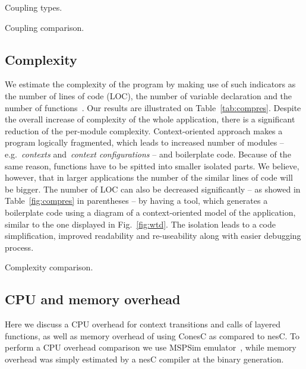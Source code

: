 \begin{table}[!h]
\renewcommand{\arraystretch}{1.3}
\caption{Coupling types.}
\label{tab:couptypes}

\end{table}

\begin{table}[!h]
\renewcommand{\arraystretch}{1.3}
\caption{Coupling comparison.}
\label{tab:coupres}

\end{table}

\subsection{Complexity} 

We estimate the complexity of the program by making use of such indicators as the number of
lines of code (LOC), the number of variable declaration and the number of
functions~\cite{pressman01}. Our results are illustrated on
Table~\ref{tab:compres}. Despite the overall increase of complexity of the whole
application, there is a significant reduction of the per-module complexity.
Context-oriented approach makes a program logically
fragmented, which leads to increased number of modules -- e.g.~\emph{contexts}
and~\emph{context configurations} -- and boilerplate code. Because of the same
reason, functions have to be spitted into smaller isolated parts. We believe, however,
that in larger applications the number of the similar lines of code will be bigger.
The number of LOC can also be decreased significantly -- as showed in Table~\ref{fig:compres} in
parentheses -- by having a tool, which generates a boilerplate code using a diagram of a
context-oriented model of the application, similar to the one displayed in Fig.~\ref{fig:wtd}.
The isolation leads to a code simplification, improved
readability and re-useability along with easier debugging process.

\begin{table}[!h]
\renewcommand{\arraystretch}{1.3}
\caption{Complexity comparison.}
\label{tab:compres}

\end{table}

\subsection{CPU and memory overhead}

Here we discuss a CPU overhead for context transitions and calls of layered
functions, as well as memory overhead of using ConesC as compared to nesC. To perform a CPU
overhead comparison we use MSPSim emulator~\cite{eriksson09}, while memory overhead was
simply estimated by a nesC compiler at the binary generation.

